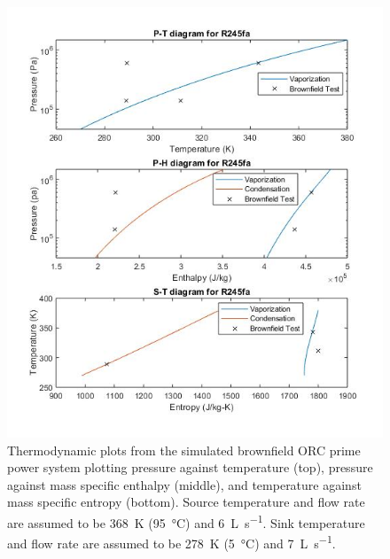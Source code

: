 \begin{figure}[h]
	\centering

	\includegraphics[width=\textwidth]{figures/BrownfieldThermoPlots}
	\caption{Thermodynamic plots from the simulated brownfield ORC prime power system plotting pressure against temperature (top), pressure against mass specific enthalpy (middle), and temperature against mass specific entropy (bottom). Source temperature and flow rate are assumed to be \SI{368}{\kelvin} (\SI{95}{\degreeCelsius}) and \SI{6}{\liter\per\second}. Sink temperature and flow rate are assumed to be \SI{278}{\kelvin} (\SI{5}{\degreeCelsius}) and \SI{7}{\liter\per\second}.}
	\label{fig:bf_themoplots}
\end{figure}